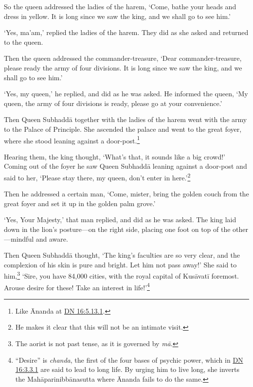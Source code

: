 \documentclass[12pt,openany]{book}%
\begin{document}
So the queen addressed the ladies of the harem, ‘Come, bathe your heads and dress in yellow. It is long since we saw the king, and we shall go to see him.’ 

‘Yes, ma’am,’ replied the ladies of the harem. They did as she asked and returned to the queen. 

Then the queen addressed the commander-treasure, ‘Dear commander-treasure, please ready the army of four divisions. It is long since we saw the king, and we shall go to see him.’ 

‘Yes, my queen,’ he replied, and did as he was asked. He informed the queen, ‘My queen, the army of four divisions is ready, please go at your convenience.’ 

Then Queen \textsanskrit{Subhaddā} together with the ladies of the harem went with the army to the Palace of Principle. She ascended the palace and went to the great foyer, where she stood leaning against a door-post.\footnote{Like Ānanda at \href{https://suttacentral.net/dn16/en/sujato\#5.13.1}{DN 16:5.13.1}. } 

Hearing them, the king thought, ‘What’s that, it sounds like a big crowd!’ Coming out of the foyer he saw Queen \textsanskrit{Subhaddā} leaning against a door-post and said to her, ‘Please stay there, my queen, don’t enter in here.’\footnote{He makes it clear that this will not be an intimate visit. } 

Then he addressed a certain man, ‘Come, mister, bring the golden couch from the great foyer and set it up in the golden palm grove.’ 

‘Yes, Your Majesty,’ that man replied, and did as he was asked. The king laid down in the lion’s posture—on the right side, placing one foot on top of the other—mindful and aware. 

Then Queen \textsanskrit{Subhaddā} thought, ‘The king’s faculties are so very clear, and the complexion of his skin is pure and bright. Let him not pass away!’ She said to him,\footnote{The aorist is not past tense, as it is governed by \textit{\textsanskrit{mā}}. } ‘Sire, you have 84,000 cities, with the royal capital of \textsanskrit{Kusāvatī} foremost. Arouse desire for these! Take an interest in life!’\footnote{“Desire” is \textit{chanda}, the first of the four bases of psychic power, which in \href{https://suttacentral.net/dn16/en/sujato\#3.3.1}{DN 16:3.3.1} are said to lead to long life. By urging him to live long, she inverts the \textsanskrit{Mahāparinibbānasutta} where Ānanda fails to do the same. } 
\end{document}
